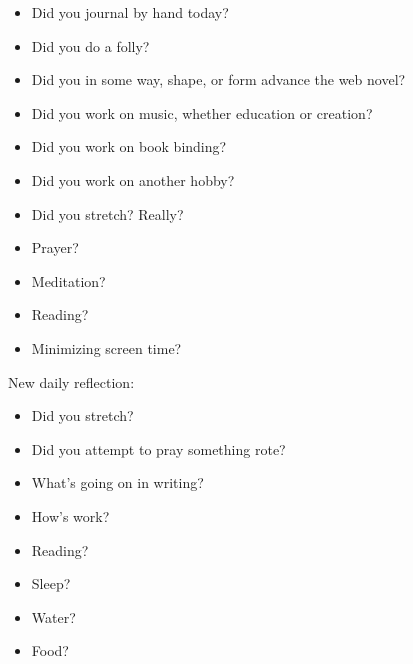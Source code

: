 \documentclass[12pt]{article}
\renewcommand{\,}{\textsuperscript{,}}
\begin{document}
\begin{itemize}

\item Did you journal by hand today?

\item Did you do a folly?

\item Did you in some way, shape, or form advance the web novel?

\item Did you work on music, whether education or creation?

\item Did you work on book binding?

\item Did you work on another hobby?

\item Did you stretch? Really?

\item Prayer?

\item Meditation?

\item Reading?

\item Minimizing screen time?

\end{itemize}

New daily reflection:

\begin{itemize}

\item Did you stretch?

\item Did you attempt to pray something rote?

\item What's going on in writing?

\item How's work?

\item Reading?

\item Sleep?

\item Water?

\item Food?

\end{itemize}
\end{document}
